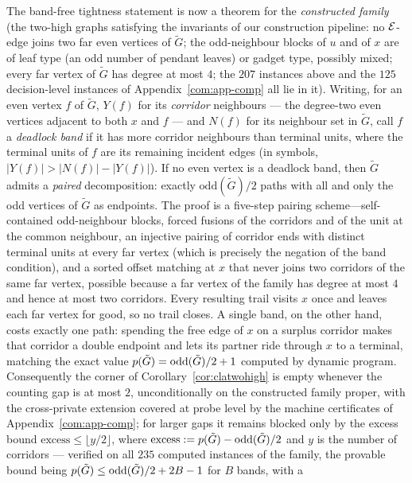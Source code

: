 \begin{remark}
The band-free tightness statement is now a theorem for the \emph{constructed
family} (the two-high graphs satisfying the invariants of our construction
pipeline: no $\mathcal{E}$-edge joins two far even vertices of $\tilde G$; the
odd-neighbour blocks of $u$ and of $x$ are of leaf type (an odd number of
pendant leaves) or gadget type, possibly mixed; every far vertex of
$\tilde G$ has degree at most $4$; the $207$ instances above and the $125$
decision-level instances of Appendix~\ref{com:app-comp} all lie in it).
Writing, for an even vertex $f$ of $\tilde G$, $Y(f)$ for its
\emph{corridor} neighbours --- the degree-two even vertices adjacent to
both $x$ and $f$ --- and $N(f)$ for its neighbour set in $\tilde G$, call
$f$ a \emph{deadlock band} if it has more corridor neighbours than
terminal units, where the terminal units of $f$ are its remaining incident
edges (in symbols, $|Y(f)|>|N(f)|-|Y(f)|$). If no even vertex is a
deadlock band, then $\tilde G$ admits a \emph{paired} decomposition:
exactly $\mathrm{odd}(\tilde G)/2$ paths with all and only the odd
vertices of $\tilde G$ as endpoints. The proof is a five-step pairing
scheme---self-contained odd-neighbour blocks, forced fusions of the
corridors and of the unit at the common neighbour, an injective pairing of
corridor ends with distinct terminal units at every far vertex (which is
precisely the negation of the band condition), and a sorted offset
matching at $x$ that never joins two corridors of the same far vertex,
possible because a far vertex of the family has degree at most $4$ and
hence at most two corridors. Every resulting trail visits $x$ once and
leaves each far vertex for good, so no trail closes. A single band, on
the other hand, costs exactly one path: spending the free edge of $x$ on a
surplus corridor makes that corridor a double endpoint and lets its
partner ride through $x$ to a terminal, matching the exact value
$p(\tilde G)=\mathrm{odd}(\tilde G)/2+1$ computed by dynamic program.
Consequently the corner of Corollary~\ref{cor:clatwohigh} is empty
whenever the counting gap is at most $2$, unconditionally on the
constructed family proper, with the cross-private extension covered at
probe level by the machine certificates of Appendix~\ref{com:app-comp}; for
larger gaps it remains blocked only by the excess bound
$\mathrm{excess}\le\lfloor y/2\rfloor$, where
$\mathrm{excess}:=p(\tilde G)-\mathrm{odd}(\tilde G)/2$ and $y$ is the
number of corridors --- verified on all $235$ computed instances of the
family, the provable bound being
$p(\tilde G)\le \mathrm{odd}(\tilde G)/2+2B-1$ for $B$ bands, with a

\end{remark}
